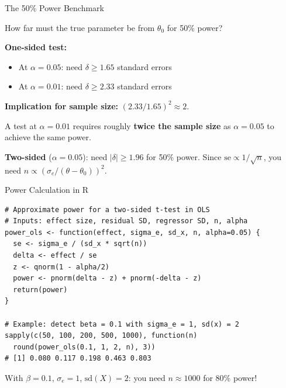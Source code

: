 \documentclass[handout, aspectratio=169]{beamer}
\numberwithin{equation}{section}
\begin{document}
\begin{frame}{The 50\% Power Benchmark}

How far must the true parameter be from $\theta_0$ for 50\% power?

\pause
\smallskip

\textbf{One-sided test:}
\begin{itemize}
\item At $\alpha = 0.05$: need $\delta \geq 1.65$ standard errors
\item At $\alpha = 0.01$: need $\delta \geq 2.33$ standard errors
\end{itemize}

\pause
\smallskip

\textbf{Implication for sample size:}  $(2.33/1.65)^2 \approx 2$.

\begin{tcolorbox}[colback=blue!5, colframe=blue!50]
A test at $\alpha = 0.01$ requires roughly \textbf{twice the sample size} as $\alpha = 0.05$ to achieve the same power.
\end{tcolorbox}

\pause
\smallskip

\textbf{Two-sided} ($\alpha = 0.05$): need $|\delta| \geq 1.96$ for 50\% power.  Since $\text{se} \propto 1/\sqrt{n}$, you need $n \propto (\sigma_e / (\theta - \theta_0))^2$.
\end{frame}

\begin{frame}[fragile]{Power Calculation in R}
\begin{lstlisting}
# Approximate power for a two-sided t-test in OLS
# Inputs: effect size, residual SD, regressor SD, n, alpha
power_ols <- function(effect, sigma_e, sd_x, n, alpha=0.05) {
  se <- sigma_e / (sd_x * sqrt(n))
  delta <- effect / se
  z <- qnorm(1 - alpha/2)
  power <- pnorm(delta - z) + pnorm(-delta - z)
  return(power)
}

# Example: detect beta = 0.1 with sigma_e = 1, sd(x) = 2
sapply(c(50, 100, 200, 500, 1000), function(n)
  round(power_ols(0.1, 1, 2, n), 3))
# [1] 0.080 0.117 0.198 0.463 0.803
\end{lstlisting}

\vspace{-0.2cm}
With $\beta = 0.1$, $\sigma_e = 1$, $\text{sd}(X) = 2$: you need $n \approx 1000$ for 80\% power!
\end{frame}
\end{document}

